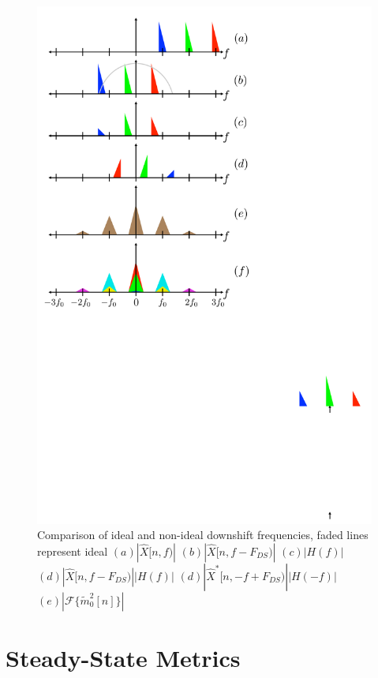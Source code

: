 \documentclass [11pt, proquest,oneside] {uwthesis}[2015/03/03]
\begin{document}
\begin{figure}[!ht]
  \centering
    \includegraphics[width=1\textwidth]{downshift_effects} 
    \caption{Comparison of ideal and non-ideal downshift frequencies, faded lines represent ideal
			    $(a) | \widehat{X}[n,f) |$   
    				$(b) | \widehat{X}[n,f - F_{DS}) |$  
				$(c) | H(f) |$
    				$(d) | \widehat{X}[n,f - F_{DS}) | | H(f) |$  
				$(d) | \widehat{X}^*[n,-f + F_{DS}) | | H(-f) |$
				$(e) | \mathcal{F} \{ \tilde{m}_0^2[n] \} |$ }\label{fig:downshift_effects}
\end{figure}

\section{Steady-State Metrics}
\end{document}
